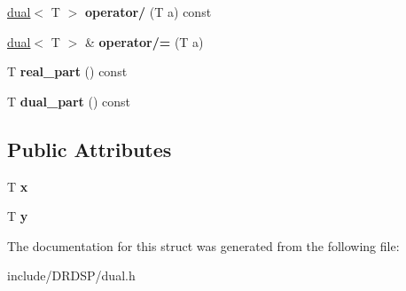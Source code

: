 \begin{DoxyCompactItemize}
\item 
\hypertarget{struct_d_r_d_s_p_1_1dual_aee0393d389be9cab632f122a268a620d}{\hyperlink{struct_d_r_d_s_p_1_1dual}{dual}$<$ T $>$ {\bfseries operator/} (T a) const }\label{struct_d_r_d_s_p_1_1dual_aee0393d389be9cab632f122a268a620d}

\item 
\hypertarget{struct_d_r_d_s_p_1_1dual_aeec246dcd6730e2e3e23f9c6c0ea4e78}{\hyperlink{struct_d_r_d_s_p_1_1dual}{dual}$<$ T $>$ \& {\bfseries operator/=} (T a)}\label{struct_d_r_d_s_p_1_1dual_aeec246dcd6730e2e3e23f9c6c0ea4e78}

\item 
\hypertarget{struct_d_r_d_s_p_1_1dual_a36d28afb644f5f27dd1299b3e5c4ca0c}{T {\bfseries real\-\_\-part} () const }\label{struct_d_r_d_s_p_1_1dual_a36d28afb644f5f27dd1299b3e5c4ca0c}

\item 
\hypertarget{struct_d_r_d_s_p_1_1dual_af1d6079aacb711e6e05924bd131ff0d7}{T {\bfseries dual\-\_\-part} () const }\label{struct_d_r_d_s_p_1_1dual_af1d6079aacb711e6e05924bd131ff0d7}

\end{DoxyCompactItemize}
\subsection*{Public Attributes}
\begin{DoxyCompactItemize}
\item 
\hypertarget{struct_d_r_d_s_p_1_1dual_aa10eb23e32f77dacdc868c9a1df38b69}{T {\bfseries x}}\label{struct_d_r_d_s_p_1_1dual_aa10eb23e32f77dacdc868c9a1df38b69}

\item 
\hypertarget{struct_d_r_d_s_p_1_1dual_acc5892de3194e38d4c504467cfaa9da7}{T {\bfseries y}}\label{struct_d_r_d_s_p_1_1dual_acc5892de3194e38d4c504467cfaa9da7}

\end{DoxyCompactItemize}


The documentation for this struct was generated from the following file\-:\begin{DoxyCompactItemize}
\item 
include/\-D\-R\-D\-S\-P/dual.\-h\end{DoxyCompactItemize}
